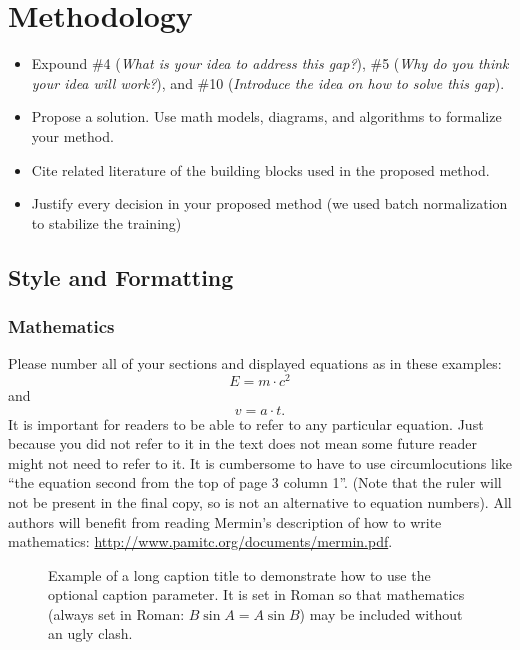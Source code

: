 \chapter{Methodology}
\label{ch:methodology}

\begin{itemize}
    \item Expound \#4 (\emph{What is your idea to address this gap?}), \#5 (\emph{Why do you think your idea will work?}), and \#10 (\emph{Introduce the idea on how to solve this gap}).
    \item Propose a solution. Use math models, diagrams, and algorithms to formalize your method.
    \item Cite related literature of the building blocks used in the proposed method.
    \item Justify every decision in your proposed method (\eg we used batch normalization to stabilize the training)
\end{itemize}

\section{Style and Formatting}
\label{sec:style-formatting}

\subsection{Mathematics}

Please number all of your sections and displayed equations as in these examples:
\begin{equation}
  E = m\cdot c^2
  \label{eq:important}
\end{equation}
and
\begin{equation}
  v = a\cdot t.
  \label{eq:also-important}
\end{equation}
It is important for readers to be able to refer to any particular equation.
Just because you did not refer to it in the text does not mean some future reader might not need to refer to it.
It is cumbersome to have to use circumlocutions like ``the equation second from the top of page 3 column 1''.
(Note that the ruler will not be present in the final copy, so is not an alternative to equation numbers).
All authors will benefit from reading Mermin's description of how to write mathematics:
\url{http://www.pamitc.org/documents/mermin.pdf}.

\begin{figure}[t]
  \centering
  \fbox{\rule{0pt}{2in} \rule{0.9\linewidth}{0pt}}

   \caption[Example of a shortened caption.]{Example of a long caption title to demonstrate how to use the optional caption parameter.
   It is set in Roman so that mathematics (always set in Roman: $B \sin A = A \sin B$) may be included without an ugly clash.}
   \label{fig:onecol}
\end{figure}


